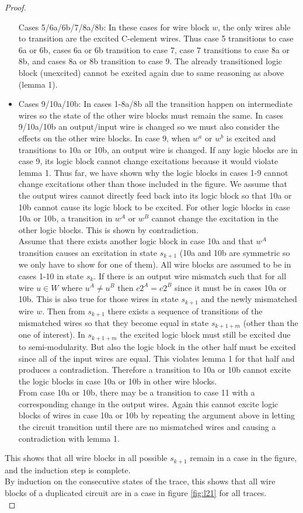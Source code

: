 \documentclass[12pt]{report}
\begin{document}
\begin{proof}
\begin{itemize}
Cases 5/6a/6b/7/8a/8b:  In these cases for wire block $w$, the only wires able to transition are the excited C-element wires.  Thus case 5 transitions to case 6a or 6b, cases 6a or 6b transition to case 7, case 7 transitions to case 8a or 8b, and cases 8a or 8b transition to case 9.  The already transitioned logic block (unexcited) cannot be excited again due to same reasoning as above (lemma 1).
\item
Cases 9/10a/10b:  In cases 1-8a/8b all the transition happen on intermediate wires so the state of the other wire blocks must remain the same.  In cases 9/10a/10b an output/input wire is changed so we must also consider the effects on the other wire blocks.  In case 9, when $w^a$ or $w^b$ is excited and transitions to 10a or 10b, an output wire is changed.  If any logic blocks are in case 9, its logic block cannot change excitations because it would violate lemma 1.  Thus far, we have shown why the logic blocks in cases 1-9 cannot change excitations other than those included in the figure.  We assume that the output wires cannot directly feed back into its logic block so that 10a or 10b cannot cause its logic block to be excited. For other logic blocks in case 10a or 10b, a transition in $w^A$ or $w^B$ cannot change the excitation in the other logic blocks.  This is shown by contradiction.  \\
Assume that there exists another logic block in case 10a and that $w^A$ transition causes an excitation in state $s_{k+1}$ (10a and 10b are symmetric so we only have to show for one of them).  All wire blocks are assumed to be in cases 1-10 in state $s_k$.  If there is an output wire mismatch such that for all wire $u\in W$ where $u^A\neq u^B$ then $c2^A=c2^B$ since it must be in cases 10a or 10b.  This is also true for those wires in state $s_{k+1}$ and the newly mismatched wire $w$.  Then from $s_{k+1}$ there exists a sequence of transitions of the mismatched wires so that they become equal in state $s_{k+1+m}$ (other than the one of interest).  In $s_{k+1+m}$ the excited logic block must still be excited due to semi-modularity.  But also the logic block in the other half must be excited since all of the input wires are equal.  This violates lemma 1 for that half and produces a contradiction.  Therefore a transition to 10a or 10b cannot excite the logic blocks in case 10a or 10b in other wire blocks.\\
From case 10a or 10b, there may be a transition to case 11 with a corresponding change in the output wires.  Again this cannot excite logic blocks of wires in case 10a or 10b by repeating the argument above in letting the circuit transition until there are no mismatched wires and causing a contradiction with lemma 1.

\end{itemize}
This shows that all wire blocks in all possible $s_{k+1}$ remain in a case in the figure, and the induction step is complete.\\
By induction on the consecutive states of the trace, this shows that all wire blocks of a duplicated circuit are in a case in figure \ref{fig:l21} for all traces. \\
\end{proof}
\end{document}
